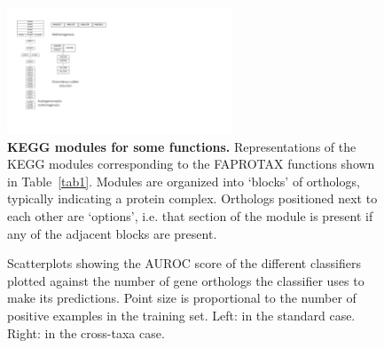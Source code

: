 \documentclass[10pt,letterpaper]{article}
\begin{document}
\begin{figure}
\includegraphics[width=0.6\textwidth]{fig2}
\caption{{\bf KEGG modules for some functions.}
Representations of the KEGG modules corresponding to the FAPROTAX functions shown in Table~\ref{tab1}. Modules are organized into `blocks' of orthologs, typically indicating a protein complex. Orthologs positioned next to each other are `options', i.e. that section of the module is present if any of the adjacent blocks are present.}
\label{fig2}
\end{figure}

\begin{figure}
 \caption{Scatterplots showing the AUROC score of the different classifiers plotted against the number of gene orthologs the classifier uses to make its predictions. Point size is proportional to the number of positive examples in the training set. Left: in the standard case. Right: in the cross-taxa case.}\label{fig3}
\end{figure}
\end{document}
